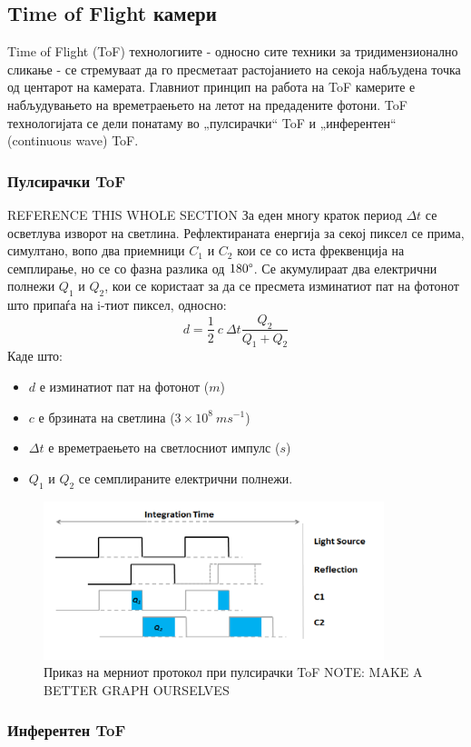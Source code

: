 \documentclass{article}
\begin{document}
\subsection{Time of Flight камери}
Time of Flight (ToF) технологиите - односно сите техники за тридимензионално сликање - се стремуваат да го пресметаат растојанието на секоја набљудена точка од центарот на камерата. Главниот принцип на работа на ToF камерите е набљудувањето на времетраењето на летот на предадените фотони. ToF технологијата се дели понатаму во „пулсирачки“ ToF и „инферентен“ (continuous wave) ToF.
\subsubsection{Пулсирачки ToF}
REFERENCE THIS WHOLE SECTION
За еден многу краток период $ \Delta t $ се осветлува изворот на светлина. Рефлектираната енергија за секој пиксел се прима, симултано, вопо два приемници $C_1$ и $C_2$ кои се со иста фреквенција на семплирање, но се со фазна разлика од $180 \degree$. Се акумулираат два електрични полнежи $Q_1$ и  $Q_2$, кои се користаат за да се пресмета изминатиот пат на фотонот што припаѓа на i-тиот пиксел, односно:
$$ d = \frac{1}{2} \ c\  \Delta t \frac{Q_2}{Q_1 + Q_2} $$
Каде што:
\begin{itemize}
\item $d$ е изминатиот пат на фотонот ($m$)
\item $c$ е брзината на светлина ($ 3 \times 10^8\ ms^{-1} $)
\item $\Delta t$ е времетраењето на светлосниот импулс ($s$)
\item $Q_1$ и $Q_2$ се семплираните електрични полнежи.
\end{itemize} 

\begin{figure}[H]
\includegraphics[width=0.5\linewidth]{impulseToF.png}
\centering
\caption{Приказ на мерниот протокол при пулсирачки ToF NOTE: MAKE A BETTER GRAPH OURSELVES}
\label{fig:impulseToF.png}
\end{figure}

\subsubsection{Инферентен ToF}
\end{document}
